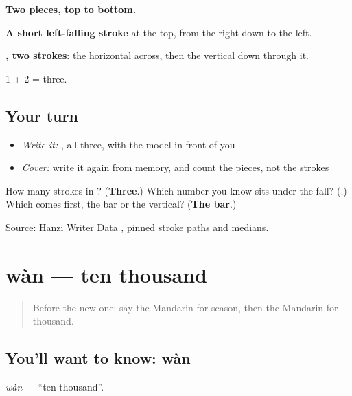 \begin{quote}
\end{quote}

\textbf{Two pieces, top to bottom.}

\textbf{A short left-falling stroke} at the top, from the right down to the left.

\textbf{, two strokes}: the horizontal across, then the vertical down through it.

1 + 2 = three.

\subsection*{Your turn}
\begin{itemize}
\raggedright
  \item \emph{Write it:} , all three, with the model in front of you
  \item \emph{Cover:} write it again from memory, and count the pieces, not the strokes
\end{itemize}

\begin{tcolorbox}[breakable,colback=teal!4,colframe=teal!35!black,title={Before you move on}]
How many strokes in ? (\textbf{Three}.) Which number you know sits under the fall? (\textbf{}.) Which comes first, the bar or the vertical? (\textbf{The bar}.)

Source: \href{https://raw.githubusercontent.com/chanind/hanzi-writer-data/68d10a4b21150cae5e1ebbd223eed289cf32d90c/data/\%E5\%8D\%83.json}{Hanzi Writer Data , pinned stroke paths and medians}.
\end{tcolorbox}
\section[wàn]{wàn — ten thousand}

\label{lesson:ZH-C132-wan}



\begin{quote}
Before the new one: say the Mandarin for season, then the Mandarin for thousand.
\end{quote}

\subsection*{You'll want to know: wàn}
\emph{wàn} — \textquotedblleft{}ten thousand\textquotedblright{}.

